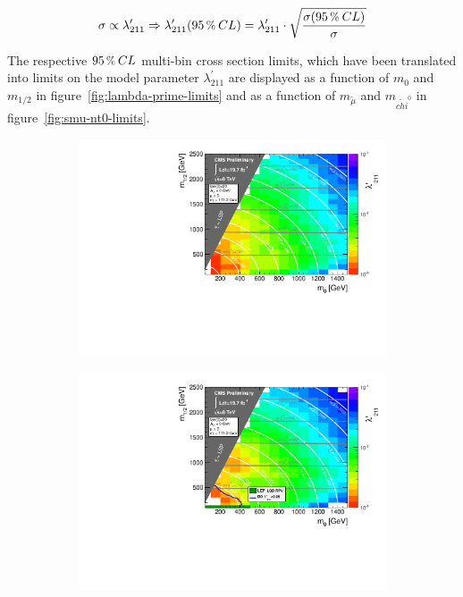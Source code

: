 \begin{equation}
  \label{eq:xs-lambda-scale}
  \sigma \propto \lambda^\prime_{211} \Rightarrow \lambda^\prime_{211} (95\,\pct\: CL) = \lambda^\prime_{211} \cdot \sqrt{ \frac{\sigma (95\,\pct\: CL)}{\sigma} } 
\end{equation}

The respective $95\,\pct\: CL$ multi-bin cross section limits, which have been translated into limits on the model parameter $\lambda^{\prime}_{211}$ are displayed as a function of $m_0$ and $m_{1/2}$ in figure~\ref{fig:lambda-prime-limits} and as a function of $m_{\tilde{\mu}}$ and $m_{\tilde{chi}^0}$ in figure~\ref{fig:smu-nt0-limits}.

\begin{figure}[!htbp]
  \centering
  \begin{subfigure}[b]{0.85\textwidth}
    \centering
    \includegraphics[width=\textwidth]{plots/l211limits_MultiBin_expected_logz-colz.pdf}
    \caption{\label{fig:lambda-prime-exp}}
  \end{subfigure}
  \begin{subfigure}[b]{0.85\textwidth}
    \centering
    \includegraphics[width=\textwidth]{plots/l211limits_MultiBin_logz-colz.pdf}

\end{subfigure}
\end{figure}
